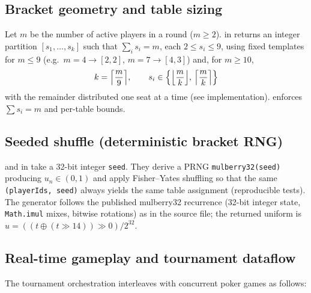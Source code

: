 \documentclass[11pt,a4paper]{article}
\begin{document}
\subsection{Bracket geometry and table sizing}

Let $m$ be the number of active players in a round ($m\ge 2$).  in  returns an integer partition $[s_1,\ldots,s_k]$ such that $\sum_i s_i = m$, each $2\le s_i\le 9$, using fixed templates for $m\le 9$ (e.g.\ $m=4\rightarrow[2,2]$, $m=7\rightarrow[4,3]$) and, for $m\ge 10$,
\[
k=\Bigl\lceil\frac{m}{9}\Bigr\rceil,\qquad
s_i \in \Bigl\{\Bigl\lfloor\frac{m}{k}\Bigr\rfloor,\,\Bigl\lceil\frac{m}{k}\Bigr\rceil\Bigr\}
\]
with the remainder distributed one seat at a time (see implementation).  enforces $\sum s_i=m$ and per-table bounds.

\subsection{Seeded shuffle (deterministic bracket RNG)}

 and  in  take a 32-bit integer \texttt{seed}. They derive a PRNG \texttt{mulberry32(seed)} producing $u_n\in(0,1)$ and apply Fisher--Yates shuffling so that the same \texttt{(playerIds, seed)} always yields the same table assignment (reproducible tests). The generator follows the published mulberry32 recurrence (32-bit integer state, \texttt{Math.imul} mixes, bitwise rotations) as in the source file; the returned uniform is $u = ((t\oplus(t\gg 14))\gg 0)/2^{32}$.

\subsection{Real-time gameplay and tournament dataflow}

The tournament orchestration interleaves with concurrent poker games as follows:
\end{document}
